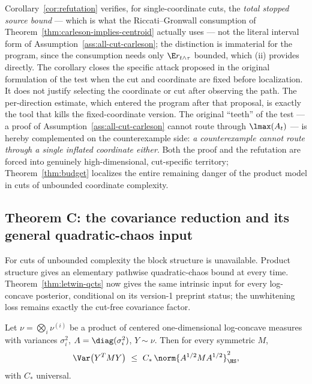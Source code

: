 \documentclass[../../main.tex]{subfiles}
\begin{document}
\begin{remark}
\label{rem:refutation-scope}
Corollary~\ref{cor:refutation} verifies, for single-coordinate cuts, the \emph{total stopped
source bound} --- which is what the Riccati--Gronwall consumption of Theorem~\ref{thm:carleson-implies-centroid}
actually uses --- not the literal interval form of Assumption~\ref{ass:all-cut-carleson}; the distinction is
immaterial for the program, since the consumption needs only
$\E r_{t\wedge\tau}$ bounded, which (ii) provides directly. The corollary closes the specific
attack proposed in the original formulation of the test when the cut and coordinate are fixed
before localization. It does not justify selecting the coordinate or cut after observing the
path. The per-direction estimate, which entered the program after that proposal, is exactly the
tool that kills the fixed-coordinate version. The original ``teeth'' of the test --- a proof of
Assumption~\ref{ass:all-cut-carleson} cannot route through $\lmax(A_t)$ --- is hereby complemented on the
counterexample side: \emph{a counterexample cannot route through a single inflated coordinate
either}. Both the proof and the refutation are forced into genuinely high-dimensional,
cut-specific territory; Theorem~\ref{thm:budget} localizes the entire remaining danger of the
product model in cuts of unbounded coordinate complexity.
\end{remark}

\subsection{Theorem C: the covariance reduction and its general quadratic-chaos input}
\label{sec:covariance-reduction}

For cuts of unbounded complexity the block structure is unavailable. Product structure gives an
elementary pathwise quadratic-chaos bound at every time. Theorem~\ref{thm:letwin-qcts} now gives
the same intrinsic input for every log-concave posterior, conditional on its version-1 preprint
status; the unwhitening loss remains exactly the cut-free covariance factor.

\begin{lemma}
\label{lem:product-qcts}
Let $\nu=\bigotimes_i\nu^{(i)}$ be a product of centered one-dimensional log-concave measures
with variances $\sigma_i^2$, $A=\diag(\sigma_i^2)$, $Y\sim\nu$. Then for every symmetric $M$,
\begin{equation}\label{eq:product-qcts}
  \Var\bigl(Y^TMY\bigr)\ \le\ C_*\,\norm{A^{1/2}MA^{1/2}}_\HS^2 ,
\end{equation}
with $C_*$ universal.
\end{lemma}
\end{document}

